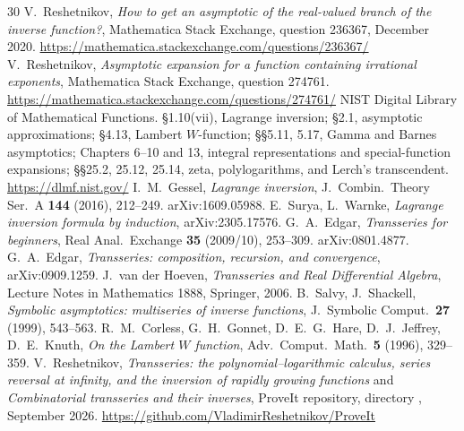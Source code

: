 \documentclass[11pt,a4paper]{article}
\numberwithin{equation}{section}
\theoremstyle{plain}
\theoremstyle{definition}
\theoremstyle{remark}
\begin{document}
\clearpage
\begin{thebibliography}{30}
 V.~Reshetnikov, \emph{How to get an asymptotic of the real-valued branch of the inverse function?}, Mathematica Stack Exchange, question 236367, December 2020. \url{https://mathematica.stackexchange.com/questions/236367/}
 V.~Reshetnikov, \emph{Asymptotic expansion for a function containing irrational exponents}, Mathematica Stack Exchange, question 274761. \url{https://mathematica.stackexchange.com/questions/274761/}
 NIST Digital Library of Mathematical Functions.
  \S1.10(vii), Lagrange inversion; \S2.1, asymptotic approximations;
  \S4.13, Lambert $W$-function; \S\S5.11, 5.17, Gamma and Barnes
  asymptotics; Chapters 6--10 and 13, integral representations and
  special-function expansions; \S\S25.2, 25.12, 25.14, zeta,
  polylogarithms, and Lerch's transcendent.
  \url{https://dlmf.nist.gov/}
 I.~M.~Gessel, \emph{Lagrange inversion}, J.\ Combin.\ Theory Ser.\ A \textbf{144} (2016), 212--249. arXiv:1609.05988.
 E.~Surya, L.~Warnke, \emph{Lagrange inversion formula by induction}, arXiv:2305.17576.
 G.~A.~Edgar, \emph{Transseries for beginners}, Real Anal.\ Exchange \textbf{35} (2009/10), 253--309. arXiv:0801.4877.
 G.~A.~Edgar, \emph{Transseries: composition, recursion, and convergence}, arXiv:0909.1259.
 J.~van der Hoeven, \emph{Transseries and Real Differential Algebra}, Lecture Notes in Mathematics 1888, Springer, 2006.
 B.~Salvy, J.~Shackell, \emph{Symbolic asymptotics: multiseries of inverse functions}, J.\ Symbolic Comput.\ \textbf{27} (1999), 543--563.
 R.~M.~Corless, G.~H.~Gonnet, D.~E.~G.~Hare, D.~J.~Jeffrey, D.~E.~Knuth, \emph{On the Lambert $W$ function}, Adv.\ Comput.\ Math.\ \textbf{5} (1996), 329--359.
 V.~Reshetnikov, \emph{Transseries: the polynomial--logarithmic calculus, series reversal at infinity, and the inversion of rapidly growing functions} and \emph{Combinatorial transseries and their inverses}, ProveIt repository, directory , September 2026. \url{https://github.com/VladimirReshetnikov/ProveIt}
\end{thebibliography}
\end{document}
